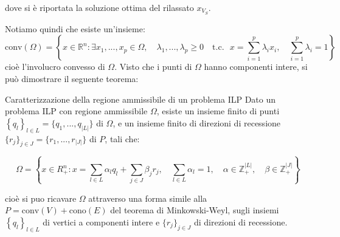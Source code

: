 \documentclass[a4paper,11pt]{article}
\begin{document}
\begin{center}


\end{center}
dove si è riportata la soluzione ottima del rilassato $x_{V_S}$.

Notiamo quindi che esiste un'insieme:
$$
\mathrm{conv} (\Omega) = \left\{ x \in \mathbb{R}^n : \exists x_1, ..., x_p \in \Omega, \quad \lambda_1, ..., \lambda_p \geq 0 \quad \text{t.c.} \ \ \ x = \sum_{i=1}^p  \lambda_i x_i, \quad \sum_{i=1}^p  \lambda_i = 1 \right\}
$$
cioè l'involucro convesso di $\Omega$.
Visto che i punti di $\Omega$ hanno componenti intere, si può dimostrare il seguente teorema:
\begin{theorem}{Caratterizzazione della regione ammissibile di un problema ILP}
	Dato un problema ILP con regione ammissibile $\Omega$, esiste un insieme finito di punti $\left\{ q_l \right\}_{l \in L} = \{ q_1, ..., q_{|L|} \}$ di $\Omega$, e un insieme finito di direzioni di recessione $\{ r_j \}_{j \in J} = \{ r_1, ..., r_|J| \}$ di $P$, tali che:

$$ 
\Omega = \left\{ x \in R^n_+: x = \sum_{l\in L} \alpha_l q_l + \sum_{j\in J} \beta_j r_j, \quad \sum_{l \in L} \alpha_l = 1, \quad \alpha \in \mathbb{Z}^{|L|}_+, \quad \beta \in \mathbb{Z}^{|J|}_+ \right\}
$$
\end{theorem}
cioè si puo ricavare $\Omega$ attraverso una forma simile alla $P = \mathrm{conv}(V) + \mathrm{cono}(E)$ del teorema di Minkowski-Weyl, sugli insiemi $\left\{ q_l \right\}_{l \in L}$ di vertici a componenti intere e $\{ r_j \}_{j \in J}$ di direzioni di recessione.
\end{document}
